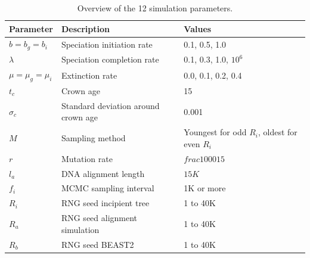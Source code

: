\documentclass{article}
\begin{document}



\appendix

\begin{table}
  \centering 
  \begin{tabular}{l l l}
    \hline
    Parameter             & Description & Values \\
    \hline
    \hline
    $b = b_g = b_i$       & Speciation initiation rate & 0.1, 0.5, 1.0 \\
    $\lambda$             & Speciation completion rate & 0.1, 0.3, 1.0, $10^6$ \\
    $\mu = \mu_g = \mu_i$ & Extinction rate & 0.0, 0.1, 0.2, 0.4 \\
    $t_c$                 & Crown age & 15 \\
    $\sigma_c$            & Standard deviation around crown age & 0.001 \\
    $M$                   & Sampling method & Youngest for odd $R_i$, oldest for even $R_i$ \\
    $r$                   & Mutation rate & $frac{1000}{15}$ \\
    $l_a$                 & DNA alignment length & $15K$ \\
    $f_i$                 & MCMC sampling interval & 1K or more \\
    $R_i$                 & RNG seed incipient tree & 1 to 40K \\
    $R_a$                 & RNG seed alignment simulation & 1 to 40K \\
    $R_b$                 & RNG seed BEAST2 & 1 to 40K \\
    \hline
  \end{tabular}
  \caption{
    Overview of the 12 simulation parameters.
  }
  \label{table:simulation_parameters}
\end{table}
\end{document}
